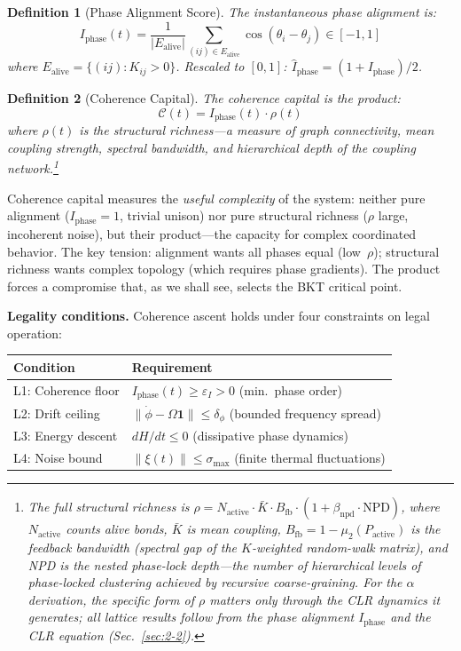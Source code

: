 \documentclass[aps,prd,onecolumn,superscriptaddress,floatfix,12pt]{revtex4-2}
\newcommand{\Iphase}{I_{\text{phase}}}
\newcommand{\Ealive}{E_{\text{alive}}}
\newtheorem{definition}{Definition}[section]
\begin{document}
\begin{definition}[Phase Alignment Score]\label{def:iphase}
The instantaneous phase alignment is:
\begin{equation}\label{eq:iphase}
\Iphase(t) = \frac{1}{|\Ealive|}\sum_{(ij) \in \Ealive} \cos(\theta_i - \theta_j) \in [-1, 1]
\end{equation}
where $\Ealive = \{(ij) : K_{ij} > 0\}$. Rescaled to $[0,1]$: $\hat{I}_{\text{phase}} = (1 + \Iphase)/2$.
\end{definition}

\begin{definition}[Coherence Capital]\label{def:capital}
The coherence capital is the product:
\begin{equation}\label{eq:capital}
\mathcal{C}(t) = \Iphase(t) \cdot \rho(t)
\end{equation}
where $\rho(t)$ is the \emph{structural richness}---a measure of graph connectivity, mean coupling strength, spectral bandwidth, and hierarchical depth of the coupling network.\footnote{The full structural richness is $\rho = N_{\text{active}} \cdot \bar{K} \cdot B_{\text{fb}} \cdot (1 + \beta_{\text{npd}} \cdot \text{NPD})$, where $N_{\text{active}}$ counts alive bonds, $\bar{K}$ is mean coupling, $B_{\text{fb}} = 1 - \mu_2(P_{\text{active}})$ is the feedback bandwidth (spectral gap of the $K$-weighted random-walk matrix), and NPD is the nested phase-lock depth---the number of hierarchical levels of phase-locked clustering achieved by recursive coarse-graining. For the $\alpha$ derivation, the specific form of $\rho$ matters only through the CLR dynamics it generates; all lattice results follow from the phase alignment $\Iphase$ and the CLR equation (Sec.~\ref{sec:2-2}).}
\end{definition}

Coherence capital measures the \emph{useful complexity} of the system: neither pure alignment ($\Iphase = 1$, trivial unison) nor pure structural richness ($\rho$ large, incoherent noise), but their product---the capacity for complex coordinated behavior. The key tension: alignment wants all phases equal (low~$\rho$); structural richness wants complex topology (which requires phase gradients). The product forces a compromise that, as we shall see, selects the BKT critical point.

\textbf{Legality conditions.} Coherence ascent holds under four constraints on legal operation:

\begin{table}[h]
\begin{tabular}{@{}lp{}@{}}
\toprule
Condition & Requirement \\
\midrule
L1: Coherence floor & $\Iphase(t) \geq \varepsilon_I > 0$ (min.\ phase order) \\
L2: Drift ceiling & $\|\dot{\phi} - \Omega\mathbf{1}\| \leq \delta_\phi$ (bounded frequency spread) \\
L3: Energy descent & $dH/dt \leq 0$ (dissipative phase dynamics) \\
L4: Noise bound & $\|\xi(t)\| \leq \sigma_{\max}$ (finite thermal fluctuations) \\
\bottomrule
\end{tabular}
\end{table}
\end{document}
